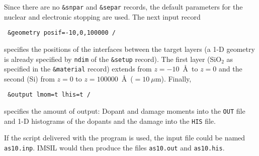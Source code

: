 Since there are no \texttt{\&snpar} and \texttt{\&separ} records, the default
parameters for the nuclear and electronic stopping are used. The next input
record 
%
\begin{verbatim}
 &geometry posif=-10,0,100000 /
\end{verbatim}
%
specifies the positions of the interfaces between the target layers
(a 1-D geometry is already specified by \texttt{ndim} of the \texttt{\&setup}
record). The first layer (SiO$_2$ as specified in the \texttt{\&material}
record) extends from $z=-10$~\AA\ to $z=0$ and the second (Si) from $z=0$ to
$z=100000$~\AA\ ($=10~\mu$m). Finally,
%
\begin{verbatim}
 &output lmom=t lhis=t /
\end{verbatim}
%
specifies the amount of output: Dopant and damage moments into the {\tt OUT}
file and 1-D histograms of the dopants and the damage into the \texttt{HIS}
file.

If the script delivered with the program is used, the input file could be named
\texttt{as10.inp}. IMSIL would then produce the files \texttt{as10.out} and
\texttt{as10.his}.

